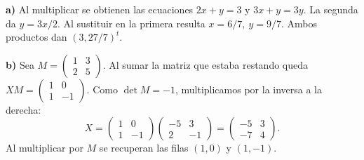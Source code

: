 \textbf{a)} Al multiplicar se obtienen las ecuaciones
$2x+y=3$ y $3x+y=3y$. La segunda da $y=3x/2$.
Al sustituir en la primera resulta
$\boxed{x=6/7,\ y=9/7}$. Ambos productos dan $(3,27/7)^t$.

\textbf{b)} Sea $M=\begin{pmatrix}1&3\\2&5\end{pmatrix}$.
Al sumar la matriz que estaba restando queda
$XM=\begin{pmatrix}1&0\\1&-1\end{pmatrix}$.
Como $\det M=-1$, multiplicamos por la inversa a la derecha:
\[
X=\begin{pmatrix}1&0\\1&-1\end{pmatrix}
\begin{pmatrix}-5&3\\2&-1\end{pmatrix}
=\boxed{\begin{pmatrix}-5&3\\-7&4\end{pmatrix}}.
\]
Al multiplicar por $M$ se recuperan las filas $(1,0)$ y $(1,-1)$.
